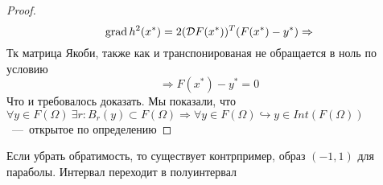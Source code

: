 \begin{proof}
    \[\operatorname{grad} h^2(x^*) = 2(\mathcal{D} F(x^*))^T(F(x^*) - y^*) \Rightarrow\]
    Тк матрица Якоби, также как и транспонированая не обращается в ноль по условию
    \[ \Rightarrow F(x^*) - y^* = 0\] 
    Что и требовалось доказать. Мы показали, что $\forall y \in F(\Omega) \ \exists r: B_r(y) \subset F(\Omega) \Longrightarrow \forall y \in F(\Omega) \hookrightarrow y \in Int(F(\Omega))$~---~открытое по определению
\end{proof}

\begin{note}
    Если убрать обратимость, то существует контрпример, образ $(-1, 1)$ для параболы. Интервал переходит в полуинтервал 
\end{note}
